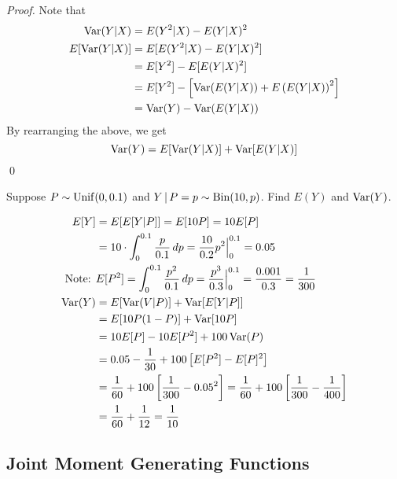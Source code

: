 \documentclass[notoc,notitlepage]{tufte-book}
\begin{document}
\begin{proof}
  Note that
  \begin{align*}
    \operatorname{Var}(Y | X) &= E( Y^2 | X ) - E( Y | X )^2 \\
    E[ \operatorname{Var}(Y | X) ] &= E[ E( Y^2 | X ) - E( Y|X )^2 ] \\
      &= E[Y^2] - E [ E(Y|X)^2 ] \\
      &= E[Y^2] - \left[ \operatorname{Var}( E(Y|X) ) + E \left( E(Y|X) \right)^2 \right] \\
      &= \operatorname{Var}(Y) - \operatorname{Var}( E(Y | X) )
  \end{align*}
  By rearranging the above, we get
  \begin{equation*}
    \operatorname{Var}(Y) = E[ \operatorname{Var}(Y|X) ] + \operatorname{Var}[ E(Y|X) ]
  \end{equation*}\qed
\end{proof}

\begin{eg}
  Suppose $P \sim \operatorname{Unif}(0, 0.1)$ and $Y \, | \, P = p \sim \operatorname{Bin}(10, p)$. Find $E(Y)$ and $\operatorname{Var}(Y)$.
\end{eg}

\begin{solution}
  \begin{align*}
    E[Y] &= E[ E[Y|P] ] = E[ 10P ] = 10 E[P] \\
      &= 10 \cdot \int_{0}^{0.1} \frac{p}{0.1} \mathop{}\!d{p} = \frac{10}{0.2} p^2 \Big|_{0}^{0.1} = 0.05 \\
    \text{Note: }& E[P^2] = \int_{0}^{0.1} \frac{p^2}{0.1} \mathop{}\!d{p} = \frac{p^3}{0.3}\Big|_{0}^{0.1} = \frac{0.001}{0.3} = \frac{1}{300} \\
    \operatorname{Var}(Y) &= E[ \operatorname{Var}(V|P) ] + \operatorname{Var}[ E[Y|P] ] \\
      &= E[ 10P(1 - P) ] + \operatorname{Var}[ 10P ] \\
      &= 10E[P] - 10E[P^2] + 100 \operatorname{Var}(P) \\
      &= 0.05 - \frac{1}{30} + 100 \left[ E[P^2] - E[P]^2 \right] \\
      &= \frac{1}{60} + 100 \left[ \frac{1}{300} - 0.05^2 \right] = \frac{1}{60} + 100 \left[ \frac{1}{300} - \frac{1}{400} \right] \\
      &= \frac{1}{60} + \frac{1}{12} = \frac{1}{10}
  \end{align*}
\end{solution}


\subsection{Joint Moment Generating Functions}%
\label{sub:joint_moment_generating_functions}
\end{document}

